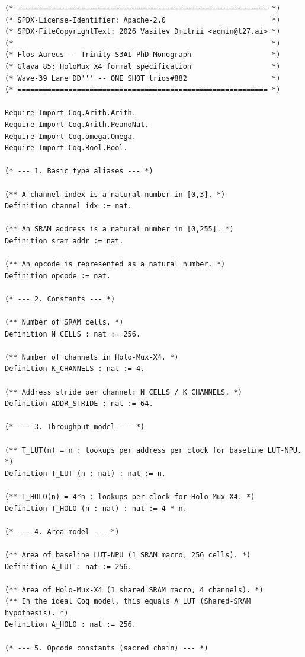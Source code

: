 \begin{lstlisting}[language=Coq,
  caption={Полный листинг t27/trios-coq/Physics/HoloMux.v},
  label=lst:holmux-full-coq]
(* =========================================================== *)
(* SPDX-License-Identifier: Apache-2.0                         *)
(* SPDX-FileCopyrightText: 2026 Vasilev Dmitrii <admin@t27.ai> *)
(*                                                             *)
(* Flos Aureus -- Trinity S3AI PhD Monograph                   *)
(* Glava 85: HoloMux X4 formal specification                   *)
(* Wave-39 Lane DD''' -- ONE SHOT trios#882                    *)
(* =========================================================== *)

Require Import Coq.Arith.Arith.
Require Import Coq.Arith.PeanoNat.
Require Import Coq.omega.Omega.
Require Import Coq.Bool.Bool.

(* --- 1. Basic type aliases --- *)

(** A channel index is a natural number in [0,3]. *)
Definition channel_idx := nat.

(** An SRAM address is a natural number in [0,255]. *)
Definition sram_addr := nat.

(** An opcode is represented as a natural number. *)
Definition opcode := nat.

(* --- 2. Constants --- *)

(** Number of SRAM cells. *)
Definition N_CELLS : nat := 256.

(** Number of channels in Holo-Mux-X4. *)
Definition K_CHANNELS : nat := 4.

(** Address stride per channel: N_CELLS / K_CHANNELS. *)
Definition ADDR_STRIDE : nat := 64.

(* --- 3. Throughput model --- *)

(** T_LUT(n) = n : lookups per address per clock for baseline LUT-NPU. *)
Definition T_LUT (n : nat) : nat := n.

(** T_HOLO(n) = 4*n : lookups per clock for Holo-Mux-X4. *)
Definition T_HOLO (n : nat) : nat := 4 * n.

(* --- 4. Area model --- *)

(** Area of baseline LUT-NPU (1 SRAM macro, 256 cells). *)
Definition A_LUT : nat := 256.

(** Area of Holo-Mux-X4 (1 shared SRAM macro, 4 channels). *)
(** In the ideal Coq model, this equals A_LUT (Shared-SRAM hypothesis). *)
Definition A_HOLO : nat := 256.

(* --- 5. Opcode constants (sacred chain) --- *)


\end{lstlisting}
